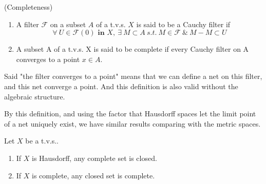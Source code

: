 \documentclass[a4paper,11pt]{report}
\begin{document}
\begin{defn}
	(Completeness)
	\begin{enumerate}[label=\arabic*)]
		\item A filter $\mathscr{F}$ on a subset $A$ of a t.v.s. $X$ is said to be a Cauchy filter if
			\begin{equation*}
				\forall~ U \in \mathscr{F}(0) \textbf{ in } X,~ \exists ~ M \subset A ~s.t.~ M \in \mathscr{F} ~\&~ M-M \subset U
			\end{equation*}
		\item A subset A of a t.v.s. X is said to be complete if every Cauchy filter on A converges to a point $x \in A$.
	\end{enumerate}
\end{defn}
\begin{rem}
	Said "the filter converges to a point" means that we can define a net on this filter, and this net converge a point. And this definition is also valid without the algebraic structure.
\end{rem}

By this definition, and using the factor that Hausdorff spaces let the limit point of a net uniquely exist, we have similar results comparing with the metric spaces.
\begin{prop}
	Let $X$ be a t.v.s..
	\begin{enumerate}[label=\arabic*)]
		\item If $X$ is Hausdorff, any complete set is closed.
		\item If $X$ is complete, any closed set is complete.
	\end{enumerate}
\end{prop}
\end{document}
